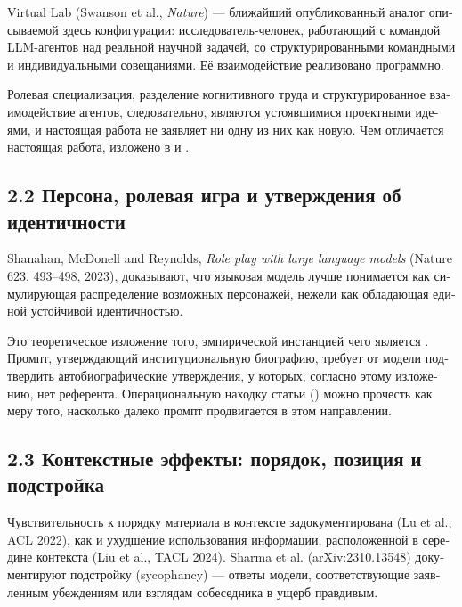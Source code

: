 \begin{russian}
\gcheck{} Virtual Lab (Swanson et al., \emph{Nature}) — ближайший опубликованный аналог описываемой здесь конфигурации: исследователь-человек, работающий с командой LLM-агентов над реальной научной задачей, со структурированными командными и индивидуальными совещаниями. Её взаимодействие реализовано программно.

Ролевая специализация, разделение когнитивного труда и структурированное взаимодействие агентов, следовательно, являются устоявшимися проектными идеями, и настоящая работа не заявляет ни одну из них как новую. Чем отличается настоящая работа, изложено в  и .


\subsection*{2.2 Персона, ролевая игра и утверждения об идентичности}
\label{sec:ru:2.2}

\gcheck{} Shanahan, McDonell and Reynolds, \emph{Role play with large language models} (Nature 623, 493–498, 2023), доказывают, что языковая модель лучше понимается как симулирующая распределение возможных персонажей, нежели как обладающая единой устойчивой идентичностью.

Это теоретическое изложение того, эмпирической инстанцией чего является . Промпт, утверждающий институциональную биографию, требует от модели подтвердить автобиографические утверждения, у которых, согласно этому изложению, нет референта. Операциональную находку статьи () можно прочесть как меру того, насколько далеко промпт продвигается в этом направлении.


\subsection*{2.3 Контекстные эффекты: порядок, позиция и подстройка}
\label{sec:ru:2.3}

\gcheck{} Чувствительность к порядку материала в контексте задокументирована (Lu et al., ACL 2022), как и ухудшение использования информации, расположенной в середине контекста (Liu et al., TACL 2024). \gcheck{} Sharma et al. (arXiv:2310.13548) документируют подстройку (sycophancy) — ответы модели, соответствующие заявленным убеждениям или взглядам собеседника в ущерб правдивым.


\end{russian}
